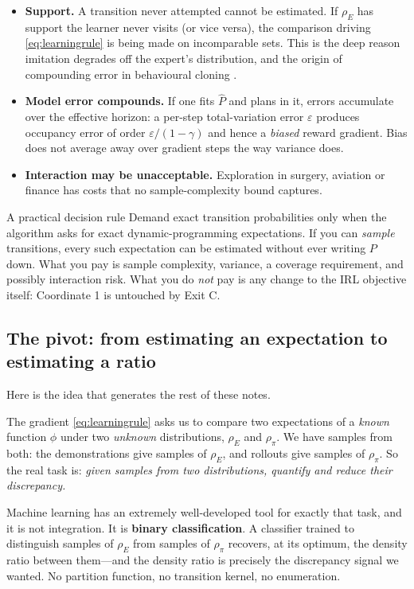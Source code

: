 \documentclass[11pt]{article}
\theoremstyle{plain}
\theoremstyle{definition}
\theoremstyle{remark}
\begin{document}
\begin{itemize}
\item \textbf{Support.} A transition never attempted cannot be estimated.
If $\rho_E$ has support the learner never visits (or vice versa), the
comparison driving \eqref{eq:learningrule} is being made on incomparable
sets. This is the deep reason imitation degrades off the expert's
distribution, and the origin of compounding error in behavioural cloning
\cite{bagnell2014}.
\item \textbf{Model error compounds.} If one fits $\widehat P$ and plans
in it, errors accumulate over the effective horizon: a per-step
total-variation error $\varepsilon$ produces occupancy error of order
$\varepsilon/(1-\gamma)$ and hence a \emph{biased} reward gradient. Bias
does not average away over gradient steps the way variance does.
\item \textbf{Interaction may be unacceptable.} Exploration in surgery,
aviation or finance has costs that no sample-complexity bound captures.
\end{itemize}

\begin{graybox}{A practical decision rule}
Demand exact transition probabilities only when the algorithm asks for
exact dynamic-programming expectations. If you can \emph{sample}
transitions, every such expectation can be estimated without ever writing
$P$ down. What you pay is sample complexity, variance, a coverage
requirement, and possibly interaction risk. What you do \emph{not} pay is
any change to the IRL objective itself: Coordinate 1 is untouched by
Exit C.
\end{graybox}

\subsection{The pivot: from estimating an expectation to estimating a ratio}

Here is the idea that generates the rest of these notes.

The gradient \eqref{eq:learningrule} asks us to compare two expectations
of a \emph{known} function $\phi$ under two \emph{unknown} distributions,
$\rho_E$ and $\rho_\pi$. We have samples from both: the demonstrations
give samples of $\rho_E$, and rollouts give samples of $\rho_\pi$. So the
real task is: \emph{given samples from two distributions, quantify and
reduce their discrepancy.}

Machine learning has an extremely well-developed tool for exactly that
task, and it is not integration. It is \textbf{binary classification}. A
classifier trained to distinguish samples of $\rho_E$ from samples of
$\rho_\pi$ recovers, at its optimum, the density ratio between
them---and the density ratio is precisely the discrepancy signal we
wanted. No partition function, no transition kernel, no enumeration.
\end{document}
